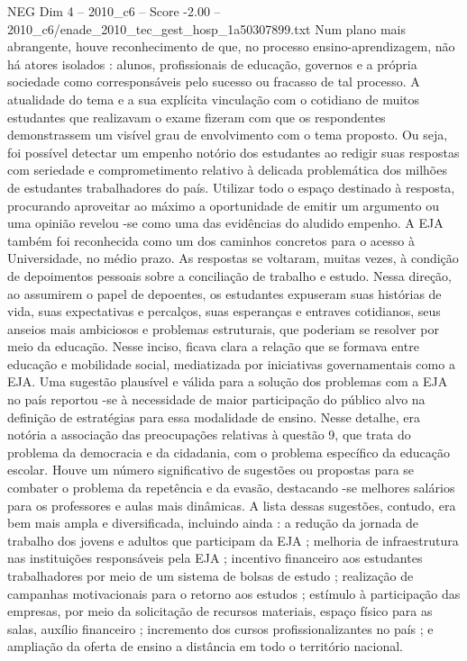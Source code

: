 \begin{textsample}{NEG Dim 4 – 2010\_c6 – Score -2.00 – 2010\_c6/enade\_2010\_tec\_gest\_hosp\_1a50307899.txt}
Num plano mais abrangente, houve reconhecimento de que, no processo ensino-aprendizagem, não há atores isolados : alunos, profissionais de educação, governos e a própria sociedade como corresponsáveis pelo sucesso ou fracasso de tal processo.
A atualidade do tema e a sua explícita vinculação com o cotidiano de muitos estudantes que realizavam o exame fizeram com que os respondentes demonstrassem um visível grau de envolvimento com o tema proposto.
Ou seja, foi possível detectar um empenho notório dos estudantes ao redigir suas respostas com seriedade e comprometimento relativo à delicada problemática dos milhões de estudantes trabalhadores do país.
Utilizar todo o espaço destinado à resposta, procurando aproveitar ao máximo a oportunidade de emitir um argumento ou uma opinião revelou -se como uma das evidências do aludido empenho.
A EJA também foi reconhecida como um dos caminhos concretos para o acesso à Universidade, no médio prazo.
As respostas se voltaram, muitas vezes, à condição de depoimentos pessoais sobre a conciliação de trabalho e estudo.
Nessa direção, ao assumirem o papel de depoentes, os estudantes expuseram suas histórias de vida, suas expectativas e percalços, suas esperanças e entraves cotidianos, seus anseios mais ambiciosos e problemas estruturais, que poderiam se resolver por meio da educação.
Nesse inciso, ficava clara a relação que se formava entre educação e mobilidade social, mediatizada por iniciativas governamentais como a EJA.
Uma sugestão plausível e válida para a solução dos problemas com a EJA no país reportou -se à necessidade de maior participação do público alvo na definição de estratégias para essa modalidade de ensino.
Nesse detalhe, era notória a associação das preocupações relativas à questão 9, que trata do problema da democracia e da cidadania, com o problema específico da educação escolar.
Houve um número significativo de sugestões ou propostas para se combater o problema da repetência e da evasão, destacando -se melhores salários para os professores e aulas mais dinâmicas.
A lista dessas sugestões, contudo, era bem mais ampla e diversificada, incluindo ainda : a redução da jornada de trabalho dos jovens e adultos que participam da EJA ; melhoria de infraestrutura nas instituições responsáveis pela EJA ; incentivo financeiro aos estudantes trabalhadores por meio de um sistema de bolsas de estudo ; realização de campanhas motivacionais para o retorno aos estudos ; estímulo à participação das empresas, por meio da solicitação de recursos materiais, espaço físico para as salas, auxílio financeiro ; incremento dos cursos profissionalizantes no país ; e ampliação da oferta de ensino a distância em todo o território nacional.

\end{textsample}
